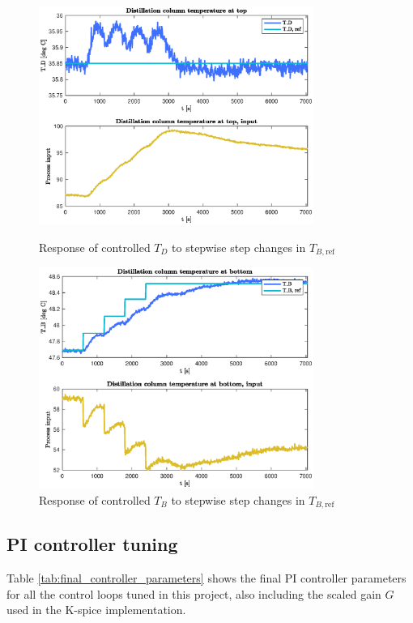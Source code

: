 \documentclass[12pt]{article}
\begin{document}
\begin{figure}[p]
\centering
\includegraphics[width=0.8\textwidth]{../Systemanalyse/Log_Data_to_Matlab/Figurer/LV_tuning/T_D_closed_loop_with_stepwise_T_B_step.eps}
\caption{Response of controlled $T_D$ to stepwise step changes in $T_{B, \textrm{ref}}$}
\label{fig:TD_TB_cl_stepwise}

\includegraphics[width=0.8\textwidth]{../Systemanalyse/Log_Data_to_Matlab/Figurer/LV_tuning/T_B_closed_loop_with_stepwise_T_B_step.eps}
\caption{Response of controlled $T_B$ to stepwise step changes in $T_{B, \textrm{ref}}$}
\label{fig:TB_TB_cl_stepwise}
\end{figure}


\subsection{PI controller tuning}
Table \ref{tab:final_controller_parameters} shows the final PI controller parameters for all the control loops tuned in this project, also including the scaled gain $G$ used in the K-spice implementation.
\end{document}
